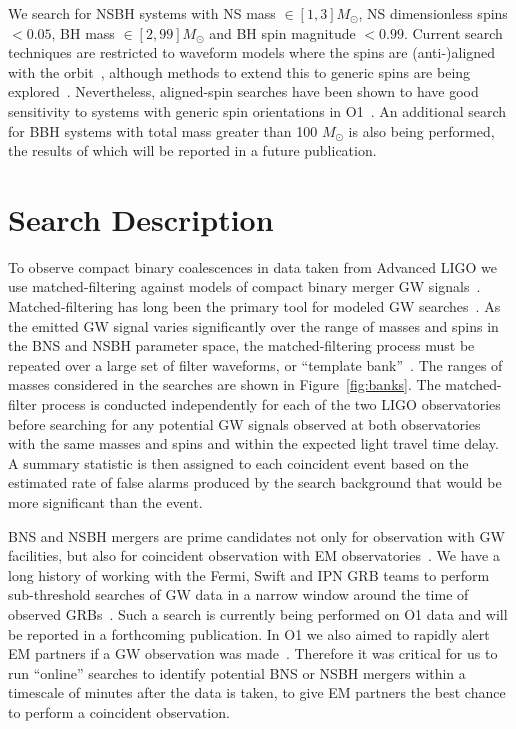 \documentclass[twocolumn]{aastex6}
\begin{document}
We search for \ac{NSBH} systems with NS mass
$\in [1,3] M_{\odot}$, NS dimensionless spins $< 0.05$, BH mass $\in [2,99] M_{\odot}$
and BH spin magnitude $< 0.99$. Current search techniques are restricted to
waveform models where the spins are (anti-)aligned with the orbit~\citep{Messick:2016aqy,Usman:2015kfa},
although methods to extend this to generic spins are being explored~\citep{Harry:2016ijz}.
Nevertheless, aligned-spin searches have been shown to have good sensitivity
to systems with generic spin orientations in \ac{O1}~\citep{Canton:2014uja,Harry:2016ijz}. An
additional search for BBH systems with total mass greater than 100 $M_{\odot}$
is also being performed, the results of which will be reported in a future publication.


\section{Search Description}
\label{sec:search_description}

To observe compact binary coalescences in data taken from Advanced \ac{LIGO} we use
matched-filtering against models of compact binary merger \ac{GW} signals~\citep{Wainstein}.
Matched-filtering has long been the primary tool for modeled \ac{GW} searches~\citep{Abbott:2003pj, Colaboration:2011np}.
As the emitted \ac{GW} signal varies significantly over the range of masses and spins
in the \ac{BNS} and \ac{NSBH} parameter space, the matched-filtering process must be repeated
over a large set of filter waveforms, or ``template bank''~\citep{Owen:1998dk}.
The ranges of masses considered in the searches are shown in Figure~\ref{fig:banks}.
The matched-filter process is conducted independently for each of the two \ac{LIGO} observatories before searching
for any potential \ac{GW} signals observed at both observatories with the
same masses and spins and within the expected light travel time delay.
A summary statistic is then assigned to each coincident event based on the estimated
rate of false alarms produced by the search background that would be more significant than the event.

\ac{BNS} and \ac{NSBH} mergers are prime candidates not only for observation with
\ac{GW} facilities, but also for coincident observation with \ac{EM}
observatories~\citep{Eichler:1989ve, Hansen:2000am, Narayan:1992iy, Li:1998bw, Nakar:2007yr, Metzger:2011bv, Nakar:2011cw, Berger:2013jza, Zhang:2013lta, Fong:2015oha}.
We have a long history of working with the Fermi, Swift and IPN \ac{GRB} teams
to perform sub-threshold searches of \ac{GW} data in a narrow window around
the time of observed \acp{GRB}~\citep{Abbott:2005yy, Abbott:2007rh, Abadie:2012bz, Briggs:2012ce}.
Such a search is currently being performed on \ac{O1} data and will be reported in a forthcoming
publication.
In \ac{O1} we also aimed to rapidly alert \ac{EM}
partners if a \ac{GW} observation was made~\citep{Abbott:2016gcq}.
Therefore it was critical for us to run ``online'' searches
to identify potential \ac{BNS} or \ac{NSBH} mergers within a timescale of minutes after the data
is taken, to give \ac{EM} partners the best chance to perform a coincident
observation.
\end{document}
